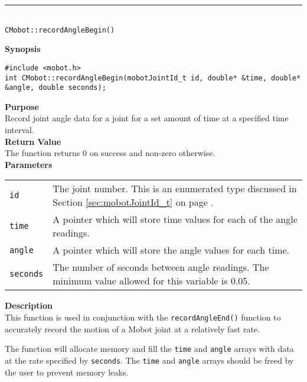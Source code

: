 \noindent
\vspace{5pt}
\rule{4.5in}{0.015in}\\
\noindent
{\LARGE \texttt{CMobot::recordAngleBegin()}}\\
{}

\noindent
{\bf Synopsis}
\vspace{-8pt}
\begin{verbatim}
#include <mobot.h>
int CMobot::recordAngleBegin(mobotJointId_t id, double* &time, double* &angle, double seconds);
\end{verbatim}

\noindent
{\bf Purpose}\\
Record joint angle data for a joint for a set amount of time at a specified time interval.\\

\noindent
{\bf Return Value}\\
The function returns 0 on success and non-zero otherwise.\\

\noindent
{\bf Parameters}\\
\vspace{-0.1in}
\begin{description}
\item               
\begin{tabular}{p{15 mm}p{145 mm}}
\texttt{id} & The joint number. This is an enumerated type 
discussed in Section \ref{sec:mobotJointId_t} on page
\pageref{sec:mobotJointId_t}.\\
\texttt{time} & A pointer which will store time values for each of the angle readings. \\
\texttt{angle} & A pointer which will store the angle values for each time. \\
\texttt{seconds} & The number of seconds between angle readings. The minimum value allowed for
this variable is 0.05.
\end{tabular}
\end{description}

\noindent
{\bf Description}\\
This function is used in conjunction with the \texttt{recordAngleEnd()}
function to accurately record the motion of a Mobot joint at a relatively fast
rate. 

The function will allocate memory and fill the \texttt{time} and \texttt{angle} arrays with data
at the rate specified by \texttt{seconds}. The \texttt{time} and \texttt{angle} arrays should
be freed by the user to prevent memory leaks.

